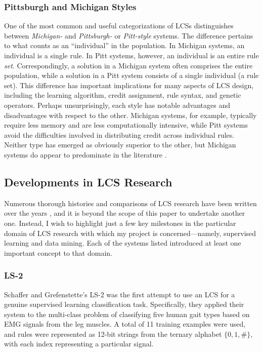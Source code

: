 \documentclass[11pt]{article}
\begin{document}
\subsubsection{Pittsburgh and Michigan Styles}

One of the most common and useful categorizations of LCSs distinguishes between \emph{Michigan-} and \emph{Pittsburgh-} or \emph{Pitt-style} systems. The difference pertains to what counts as an ``individual'' in the population. In Michigan systems, an individual is a single rule. In Pitt systems, however, an individual is an entire rule \emph{set}. Correspondingly, a solution in a Michigan system often comprises the entire population, while a solution in a Pitt system consists of a single individual (a rule set). This difference has important implications for many aspects of LCS design, including the learning algorithm, credit assignment, rule syntax, and genetic operators. Perhaps unsurprisingly, each style has notable advantages and disadvantages with respect to the other. Michigan systems, for example, typically require less memory and are less computationally intensive, while Pitt systems avoid the difficulties involved in distributing credit across individual rules. Neither type has emerged as obviously superior to the other, but Michigan systems do appear to predominate in the literature \cite{urbanowicz_learning_2009}.

\subsection{Developments in LCS Research}

Numerous thorough histories and comparisons of LCS research have been written over the years \cite{urbanowicz_learning_2009, lanzi_roadmap_2000, wilson_critical_1989, wilson_state_2000}, and it is beyond the scope of this paper to undertake another one. Instead, I wish to highlight just a few key milestones in the particular domain of LCS research with which my project is concerned---namely, supervised learning and data mining. Each of the systems listed introduced at least one important concept to that domain.

\subsubsection{LS-2}

Schaffer and Grefenstette's LS-2 \cite{schaffer_multi-objective_1985} was the first attempt to use an LCS for a genuine supervised learning classification task. Specifically, they applied their system to the multi-class problem of classifying five human gait types based on EMG signals from the leg muscles. A total of 11 training examples were used, and rules were represented as 12-bit strings from the ternary alphabet $\{0,1,\#\}$, with each index representing a particular signal.
\end{document}
